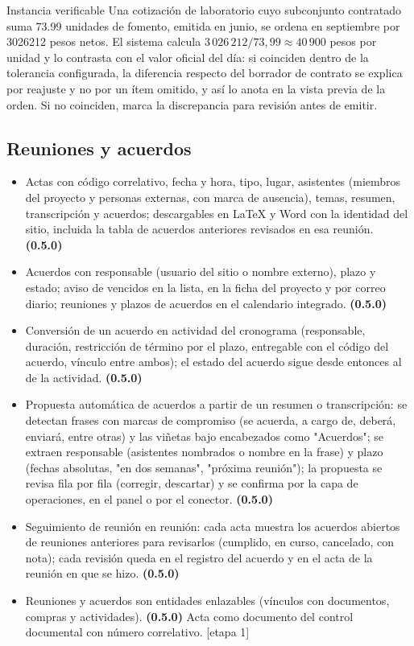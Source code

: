 \documentclass[11pt,a4paper]{article}
\newcommand{\etapa}[1]{\textcolor{grismedio}{[etapa #1]}}
\begin{document}
\begin{cajaacento}{Instancia verificable}
Una cotización de laboratorio cuyo subconjunto contratado suma \num{73.99} unidades de fomento, emitida en junio, se ordena en septiembre por \num{3026212} pesos netos. El sistema calcula $3\,026\,212 / 73{,}99 \approx 40\,900$ pesos por unidad y lo contrasta con el valor oficial del día: si coinciden dentro de la tolerancia configurada, la diferencia respecto del borrador de contrato se explica por reajuste y no por un ítem omitido, y así lo anota en la vista previa de la orden. Si no coinciden, marca la discrepancia para revisión antes de emitir.
\end{cajaacento}

\subsection{Reuniones y acuerdos}
\label{sec:reuniones}
\begin{itemize}
\item Actas con código correlativo, fecha y hora, tipo, lugar, asistentes (miembros del proyecto y personas externas, con marca de ausencia), temas, resumen, transcripción y acuerdos; descargables en LaTeX y Word con la identidad del sitio, incluida la tabla de acuerdos anteriores revisados en esa reunión. \textbf{(0.5.0)}
\item Acuerdos con responsable (usuario del sitio o nombre externo), plazo y estado; aviso de vencidos en la lista, en la ficha del proyecto y por correo diario; reuniones y plazos de acuerdos en el calendario integrado. \textbf{(0.5.0)}
\item Conversión de un acuerdo en actividad del cronograma (responsable, duración, restricción de término por el plazo, entregable con el código del acuerdo, vínculo entre ambos); el estado del acuerdo sigue desde entonces al de la actividad. \textbf{(0.5.0)}
\item Propuesta automática de acuerdos a partir de un resumen o transcripción: se detectan frases con marcas de compromiso (se acuerda, a cargo de, deberá, enviará, entre otras) y las viñetas bajo encabezados como "Acuerdos"; se extraen responsable (asistentes nombrados o nombre en la frase) y plazo (fechas absolutas, "en dos semanas", "próxima reunión"); la propuesta se revisa fila por fila (corregir, descartar) y se confirma por la capa de operaciones, en el panel o por el conector. \textbf{(0.5.0)}
\item Seguimiento de reunión en reunión: cada acta muestra los acuerdos abiertos de reuniones anteriores para revisarlos (cumplido, en curso, cancelado, con nota); cada revisión queda en el registro del acuerdo y en el acta de la reunión en que se hizo. \textbf{(0.5.0)}
\item Reuniones y acuerdos son entidades enlazables (vínculos con documentos, compras y actividades). \textbf{(0.5.0)} Acta como documento del control documental con número correlativo. \etapa{1}
\end{itemize}
\end{document}
